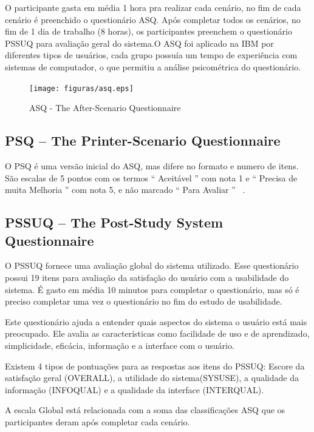 O participante gasta em média 1 hora pra realizar cada cenário, no fim de cada cenário é preenchido o questionário ASQ. Após completar todos os cenários, no fim de 1 dia de trabalho (8 horas), os participantes preenchem o questionário PSSUQ para avaliação geral do sistema.O ASQ foi aplicado na IBM por diferentes tipos de usuários, cada grupo possuía um tempo de experiência com sistemas de computador, o que permitiu a análise psicométrica do questionário.

\begin{figure}[!h]
    \centering
    \texttt{[image: figuras/asq.eps]}
    \label{ASQ - The After-Scenario Questionnaire }
	\caption{ASQ - The After-Scenario Questionnaire}
\end{figure}

\subsection{PSQ – The Printer-Scenario Questionnaire}

O PSQ  é uma versão inicial do ASQ, mas difere no formato e numero de itens.  São escalas de 5 pontos com os termos “ Aceitável ” com nota 1 e “ Precisa de muita Melhoria ” com nota 5, e não marcado “ Para Avaliar ” ~\cite{lewis1995ibm}.

\subsection{PSSUQ – The Post-Study System Questionnaire}

	O PSSUQ fornece uma avaliação global do sistema utilizado. Esse questionário possui 19 itens para avaliação da satisfação do usuário com a usabilidade do sistema. É gasto em média 10 minutos para completar o questionário, mas só é preciso completar uma vez o questionário no fim do estudo de usabilidade. ~\cite{lewis1995ibm} 

	Este questionário ajuda a entender quais aspectos do sistema o usuário está mais preocupado. Ele avalia as características como facilidade de uso e de aprendizado, simplicidade, eficácia, informação e a interface com o usuário.

	Existem 4 tipos de pontuações para as respostas aos itens do PSSUQ: Escore da satisfação geral (OVERALL), a utilidade do sistema(SYSUSE), a qualidade da  informação (INFOQUAL) e a qualidade da interface (INTERQUAL). 

A escala Global está relacionada com a soma das classificações ASQ que os participantes deram após completar cada cenário. 

